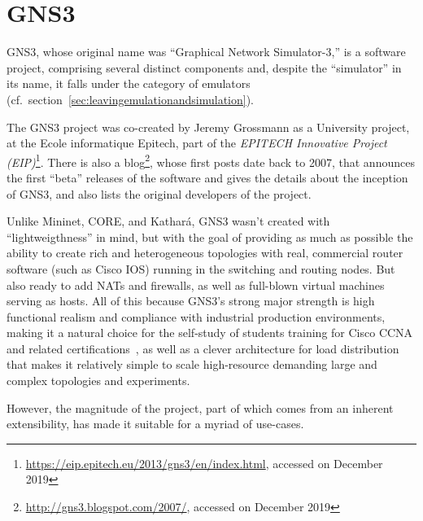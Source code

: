 \section{GNS3}
\label{sec:exemulgns3}

GNS3, whose original name was ``Graphical Network Simulator-3,'' is a software project, comprising several distinct components and, despite the ``simulator'' in its name, it falls under the category of emulators (cf.~section~\ref{sec:leavingemulationandsimulation}).

The GNS3 project was co-created by Jeremy Grossmann as a University project, at the Ecole informatique Epitech, part of the \emph{EPITECH Innovative Project (EIP)}\footnote{\url{https://eip.epitech.eu/2013/gns3/en/index.html}, accessed on December 2019}.
There is also a blog\footnote{\url{http://gns3.blogspot.com/2007/}, accessed on December 2019}, whose first posts date back to 2007, that announces the first ``beta'' releases of the software and gives the details about the inception of GNS3, and also lists the original developers of the project.

Unlike Mininet, CORE, and Kathará, GNS3 wasn't created with ``lightweigthness'' in mind, but with the goal of providing as much as possible the ability to create rich and heterogeneous topologies with real, commercial router software (such as Cisco IOS) running in the switching and routing nodes.
But also ready to add NATs and firewalls, as well as full-blown virtual machines serving as hosts.
All of this because GNS3's strong major strength is high functional realism and compliance with industrial production environments, making it a natural choice for the self-study of students  training for Cisco CCNA and related certifications~\cite{thebookofgns3,gns3netsimguide}, as well as a clever architecture for load distribution that makes it relatively simple to scale high-resource demanding large and complex topologies and experiments.

However, the magnitude of the project, part of which comes from an inherent extensibility, has made it suitable for a myriad of use-cases.

